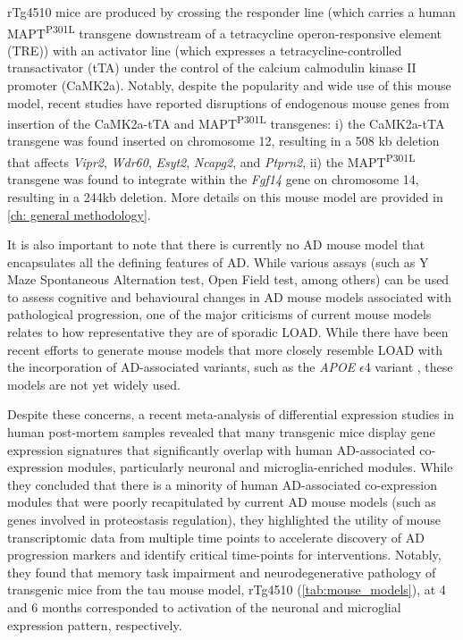 \clearpage
rTg4510 mice are produced by crossing the responder line (which carries a human MAPT\textsuperscript{P301L} transgene downstream of a tetracycline operon-responsive element (TRE)) with an activator line (which expresses a tetracycline-controlled transactivator (tTA) under the control of the calcium calmodulin kinase II promoter (CaMK2a). Notably, despite the popularity and wide use of this mouse model, recent studies have reported disruptions of endogenous mouse genes from insertion of the CaMK2a-tTA and MAPT\textsuperscript{P301L} transgenes\cite{Gamache2019}: i) the CaMK2a-tTA transgene was found inserted on chromosome 12, resulting in a 508 kb deletion that affects \textit{Vipr2}, \textit{Wdr60}, \textit{Esyt2}, \textit{Ncapg2}, and \textit{Ptprn2}, ii) the MAPT\textsuperscript{P301L} transgene was found to integrate within the \textit{Fgf14} gene on chromosome 14, resulting in a 244kb deletion. More details on this mouse model are provided in \cref{ch: general methodology}. 

It is also important to note that there is currently no AD mouse model that encapsulates all the defining features of AD. While various assays (such as Y Maze Spontaneous Alternation test, Open Field test, among others) can be used to assess cognitive and behavioural changes in AD mouse models associated with pathological progression\cite{Blackmore2017}, one of the major criticisms of current mouse models relates to how representative they are of sporadic LOAD. While there have been recent efforts to generate mouse models that more closely resemble LOAD with the incorporation of AD-associated variants, such as the \textit{APOE} $\epsilon$4 variant \cite{apoe4trem2_mousemodel,Lewandowski2020}, these models are not yet widely used. 

Despite these concerns, a recent meta-analysis of differential expression studies in human post-mortem samples revealed that many transgenic mice display gene expression signatures that significantly overlap with human AD-associated co-expression modules, particularly neuronal and microglia-enriched modules\cite{Wan2020}. While they concluded that there is a minority of human AD-associated co-expression modules that were poorly recapitulated by current AD mouse models (such as genes involved in proteostasis regulation), they highlighted the utility of mouse transcriptomic data from multiple time points to accelerate discovery of AD progression markers and identify critical time-points for interventions. Notably, they found that memory task impairment and neurodegenerative pathology of transgenic mice from the tau mouse model, rTg4510 (\cref{tab:mouse_models}), at 4 and 6 months corresponded to activation of the neuronal and microglial expression pattern, respectively. 


